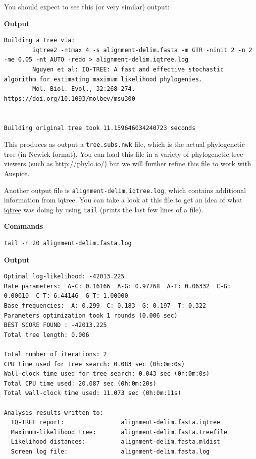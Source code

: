 \documentclass[
]{book}
\begin{document}
You should expect to see this (or very similar) output:

\textbf{Output}

\begin{verbatim}
Building a tree via:
        iqtree2 -ntmax 4 -s alignment-delim.fasta -m GTR -ninit 2 -n 2 -me 0.05 -nt AUTO -redo > alignment-delim.iqtree.log
        Nguyen et al: IQ-TREE: A fast and effective stochastic algorithm for estimating maximum likelihood phylogenies.
        Mol. Biol. Evol., 32:268-274. https://doi.org/10.1093/molbev/msu300


Building original tree took 11.159646034240723 seconds
\end{verbatim}

This produces as output a \texttt{tree.subs.nwk} file, which is the actual phylogenetic tree (in Newick format). You can load this file in a variety of phylogenetic tree viewers (such as \url{http://phylo.io/}) but we will further refine this file to work with Auspice.

Another output file is \texttt{alignment-delim.iqtree.log}, which contains additional information from iqtree. You can take a look at this file to get an idea of what \href{http://www.iqtree.org/}{iqtree} was doing by using \texttt{tail} (prints the last few lines of a file).

\textbf{Commands}

\begin{verbatim}
tail -n 20 alignment-delim.fasta.log
\end{verbatim}

\textbf{Output}

\begin{verbatim}
Optimal log-likelihood: -42013.225
Rate parameters:  A-C: 0.16166  A-G: 0.97768  A-T: 0.06332  C-G: 0.00010  C-T: 6.44146  G-T: 1.00000
Base frequencies:  A: 0.299  C: 0.183  G: 0.197  T: 0.322
Parameters optimization took 1 rounds (0.006 sec)
BEST SCORE FOUND : -42013.225
Total tree length: 0.006

Total number of iterations: 2
CPU time used for tree search: 0.083 sec (0h:0m:0s)
Wall-clock time used for tree search: 0.043 sec (0h:0m:0s)
Total CPU time used: 20.087 sec (0h:0m:20s)
Total wall-clock time used: 11.073 sec (0h:0m:11s)

Analysis results written to:
  IQ-TREE report:                alignment-delim.fasta.iqtree
  Maximum-likelihood tree:       alignment-delim.fasta.treefile
  Likelihood distances:          alignment-delim.fasta.mldist
  Screen log file:               alignment-delim.fasta.log
\end{verbatim}
\end{document}
